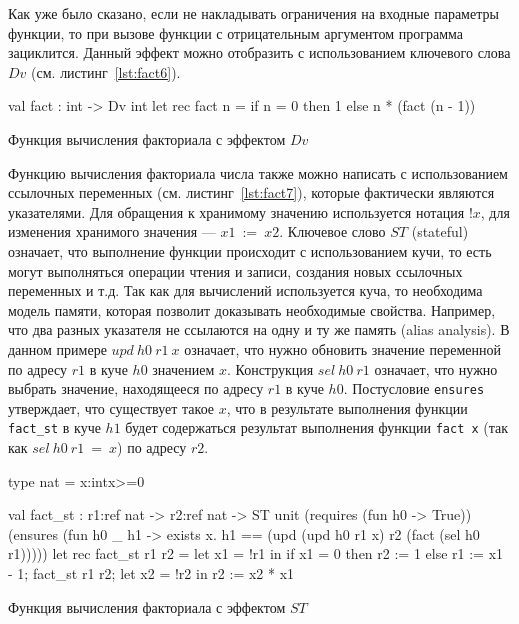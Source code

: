 \documentclass[12pt]{matmex-diploma}
\begin{document}
Как уже было сказано, если не накладывать ограничения на входные параметры функции, то при вызове функции с отрицательным аргументом программа зациклится. Данный эффект можно отобразить с использованием ключевого слова $Dv$ (см. листинг~\ref{lst:fact6}).

\begin{listing}
\begin{pyglist}[language=ocaml,numbers=none,numbersep=5pt, fontsize=\small]
val fact : int -> Dv int 
let rec fact n =
    if n = 0 then 1 else n * (fact (n - 1))
\end{pyglist}
\caption{Функция вычисления факториала с эффектом $Dv$}
\label{lst:fact6} 
\end{listing}

Функцию вычисления факториала числа также можно написать с использованием ссылочных переменных (см. листинг~\ref{lst:fact7}), которые фактически являются указателями. Для обращения к хранимому значению используется нотация $!x$, для изменения хранимого значения --- $x1~:=~x2$. Ключевое слово $ST$ (stateful) означает, что выполнение функции происходит с использованием кучи, то есть могут выполняться операции чтения и записи, создания новых ссылочных переменных и т.д. Так как для вычислений используется куча, то необходима модель памяти, которая позволит доказывать необходимые свойства. Например, что два разных указателя не ссылаются на одну и ту же память (alias analysis). В данном примере $upd~h0~r1~x$ означает, что нужно обновить значение переменной по адресу $r1$ в куче $h0$ значением $x$. Конструкция $sel~h0~r1$ означает, что нужно выбрать значение, находящееся по адресу $r1$ в куче $h0$. Постусловие \verb|ensures| утверждает, что существует такое $x$, что в результате выполнения функции \verb|fact_st| в куче $h1$ будет содержаться результат выполнения функции \verb|fact x| (так как $sel~h0~r1~=~x$) по адресу $r2$.

\begin{listing}
\begin{pyglist}[language=ocaml,numbers=none,numbersep=5pt, fontsize=\small]
type nat = x:int{x>=0} 

val fact_st : r1:ref nat -> r2:ref nat -> ST unit
    (requires (fun h0 -> True))
    (ensures (fun h0 _ h1 -> 
    exists x. h1 == (upd (upd h0 r1 x) r2 (fact (sel h0 r1)))))
let rec fact_st r1 r2 =
  let x1 = !r1 in
  if x1 = 0 
  then r2 := 1
  else
     r1 := x1 - 1;
     fact_st r1 r2;
     let x2 = !r2 in
     r2 := x2 * x1
\end{pyglist}
\caption{Функция вычисления факториала с эффектом $ST$}
\label{lst:fact7} 
\end{listing}
\end{document}
